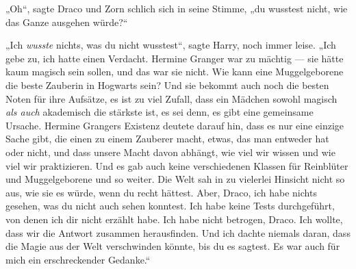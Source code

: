 „Oh“, sagte Draco und Zorn schlich sich in seine Stimme, „du wusstest nicht, wie das Ganze ausgehen würde?“

„Ich \emph{wusste} nichts, was du nicht wusstest“, sagte Harry, noch immer leise.
„Ich gebe zu, ich hatte einen Verdacht. Hermine Granger war zu mächtig — sie hätte kaum magisch sein sollen, und das war sie nicht. Wie kann eine Muggelgeborene die beste Zauberin in Hogwarts sein? Und sie bekommt auch noch die besten Noten für ihre Aufsätze, es ist zu viel Zufall, dass ein Mädchen sowohl magisch \emph{als auch} akademisch die stärkste ist, es sei denn, es gibt eine gemeinsame Ursache. Hermine Grangers Existenz deutete darauf hin, dass es nur eine einzige Sache gibt, die einen zu einem Zauberer macht, etwas, das man entweder hat oder nicht, und dass unsere Macht davon abhängt, wie viel wir wissen und wie viel wir praktizieren. Und es gab auch keine verschiedenen Klassen für Reinblüter und Muggelgeborene und so weiter. Die Welt sah in zu vielerlei Hinsicht nicht so aus, wie sie es würde, wenn du recht hättest. Aber, Draco, ich habe nichts gesehen, was du nicht auch sehen konntest. Ich habe keine Tests durchgeführt, von denen ich dir nicht erzählt habe. Ich habe nicht betrogen, Draco. Ich wollte, dass wir die Antwort zusammen herausfinden. Und ich dachte niemals daran, dass die Magie aus der Welt verschwinden könnte, bis du es sagtest. Es war auch für mich ein erschreckender Gedanke.“

